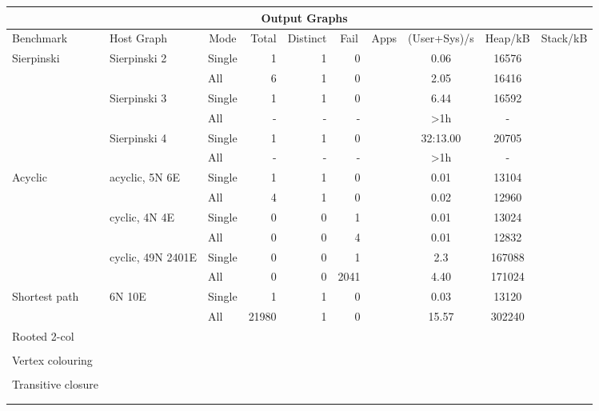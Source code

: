 \begin{sidewaystable}
\begin{tabular}{lllrrrrccc}
\hline 
 &  &  & \multicolumn{3}{c}{Output Graphs} &  & \multicolumn{1}{c}{} &  & \tabularnewline
\hline 
Benchmark & Host Graph & \multicolumn{1}{c|}{Mode} & Total & Distinct & \multicolumn{1}{c|}{Fail} & Apps & (User+Sys)/s & Heap/kB & Stack/kB\tabularnewline
\hline 
Sierpinski & Sierpinski 2 & Single & 1 & 1 & 0 &  & 0.06 & 16576 & \tabularnewline
 &  & All & 6 & 1 & 0 &  & 2.05 & 16416 & \tabularnewline
\cline{2-10} 
 & Sierpinski 3 & Single & 1 & 1 & 0 &  & 6.44 & 16592 & \tabularnewline
 &  & All & - & - & - &  & >1h & - & \tabularnewline
\cline{2-10} 
 & Sierpinski 4 & Single & 1 & 1 & 0 &  & 32:13.00 & 20705 & \tabularnewline
 &  & All & - & - & - &  & >1h & - & \tabularnewline
\hline 
Acyclic & acyclic, 5N 6E & Single & 1 & 1 & 0 &  & 0.01 & 13104 & \tabularnewline
 &  & All & 4 & 1 & 0 &  & 0.02 & 12960 & \tabularnewline
\cline{2-10} 
 & cyclic, 4N 4E & Single & 0 & 0 & 1 &  & 0.01 & 13024 & \tabularnewline
 &  & All & 0 & 0 & 4 &  & 0.01 & 12832 & \tabularnewline
\cline{2-10} 
 & cyclic, 49N 2401E & Single & 0 & 0 & 1 &  & 2.3 & 167088 & \tabularnewline
 &  & All & 0 & 0 & 2041 &  & 4.40 & 171024 & \tabularnewline
\hline 
Shortest path & 6N 10E & Single & 1 & 1 & 0 &  & 0.03 & 13120 & \tabularnewline
 &  & All & 21980 & 1 & 0 &  & 15.57 & 302240 & \tabularnewline
\hline 
Rooted 2-col &  &  &  &  &  &  &  &  & \tabularnewline
 &  &  &  &  &  &  &  &  & \tabularnewline
\hline 
Vertex colouring &  &  &  &  &  &  &  &  & \tabularnewline
 &  &  &  &  &  &  &  &  & \tabularnewline
\hline 
Transitive closure &  &  &  &  &  &  &  &  & \tabularnewline
 &  &  &  &  &  &  &  &  & \tabularnewline
 &  &  &  &  &  &  &  &  & \tabularnewline
\end{tabular}
\end{sidewaystable}
